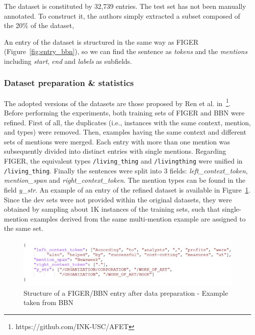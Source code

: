 The dataset is constituted by 32,739 entries. The test set has not been manually annotated. To construct it, the authors simply extracted a subset composed of the 20\% of the dataset,

An entry of the dataset is structured in the same way as FIGER (Figure~\ref{fig:entry_bbn}), so we can find the sentence as \textit{tokens} and the \textit{mentions} including \textit{start}, \textit{end} and \textit{labels} as subfields.

\subsubsection{Dataset preparation \& statistics} \label{dataset_stats}
The adopted versions of the datasets are those proposed by Ren et al. in~\cite{ren-etal-2016-afet}\footnote{https://github.com/INK-USC/AFET}. Before performing the experiments, both training sets of FIGER and BBN were refined. First of all, the duplicates (i.e., instances with the same context, mention, and types) were removed. Then, examples having the same context and different sets of mentions were merged. Each entry with more than one mention was subsequently divided into distinct entries with single mentions. Regarding FIGER, the equivalent types \texttt{/living\_thing} and \texttt{/livingthing} were unified in \texttt{/living\_thing}. Finally the sentences were split into 3 fields: \textit{left\_context\_token}, \textit{mention\_span} and \textit{right\_context\_token}. The mention types can be found in the field \textit{y\_str}. An example of an entry of the refined dataset is available in Figure~\ref{fig:entry_bbn_clean}. Since the dev sets were not provided within the original datasets, they were obtained by sampling about 1K instances of the training sets, such that single-mention examples derived from the same multi-mention example are assigned to the same set.

\begin{figure}
    \centering
    \includegraphics[width=1\linewidth]{figures/entry_bbn_clean.JPG}
    \caption{Structure of a FIGER/BBN entry after data preparation - Example taken from BBN}
    \label{fig:entry_bbn_clean}
\end{figure}


